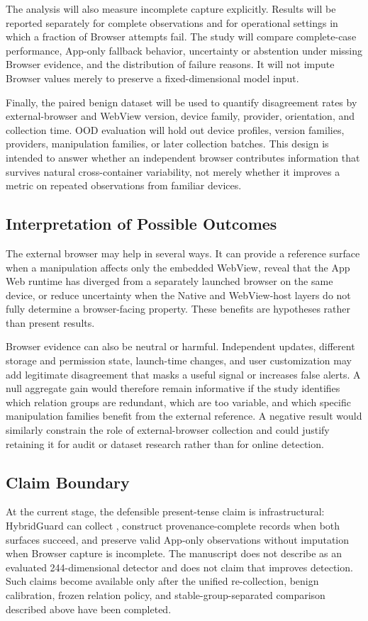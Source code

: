 The analysis will also measure incomplete capture explicitly. Results will be reported separately for complete \pairedfp observations and for operational settings in which a fraction of Browser attempts fail. The study will compare complete-case performance, App-only fallback behavior, uncertainty or abstention under missing Browser evidence, and the distribution of failure reasons. It will not impute Browser values merely to preserve a fixed-dimensional model input.

Finally, the paired benign dataset will be used to quantify disagreement rates by external-browser and WebView version, device family, provider, orientation, and collection time. OOD evaluation will hold out device profiles, version families, providers, manipulation families, or later collection batches. This design is intended to answer whether an independent browser contributes information that survives natural cross-container variability, not merely whether it improves a metric on repeated observations from familiar devices.

\subsection{Interpretation of Possible Outcomes}

The external browser may help in several ways. It can provide a reference surface when a manipulation affects only the embedded WebView, reveal that the App Web runtime has diverged from a separately launched browser on the same device, or reduce uncertainty when the Native and WebView-host layers do not fully determine a browser-facing property. These benefits are hypotheses rather than present results.

Browser evidence can also be neutral or harmful. Independent updates, different storage and permission state, launch-time changes, and user customization may add legitimate disagreement that masks a useful signal or increases false alerts. A null aggregate gain would therefore remain informative if the study identifies which relation groups are redundant, which are too variable, and which specific manipulation families benefit from the external reference. A negative result would similarly constrain the role of external-browser collection and could justify retaining it for audit or dataset research rather than for online detection.

\subsection{Claim Boundary}

At the current stage, the defensible present-tense claim is infrastructural: HybridGuard can collect \browserfp, construct provenance-complete \pairedfp records when both surfaces succeed, and preserve valid App-only observations without imputation when Browser capture is incomplete. The manuscript does not describe \pairedfp as an evaluated 244-dimensional detector and does not claim that \browserfp improves detection. Such claims become available only after the unified re-collection, benign calibration, frozen relation policy, and stable-group-separated comparison described above have been completed.
